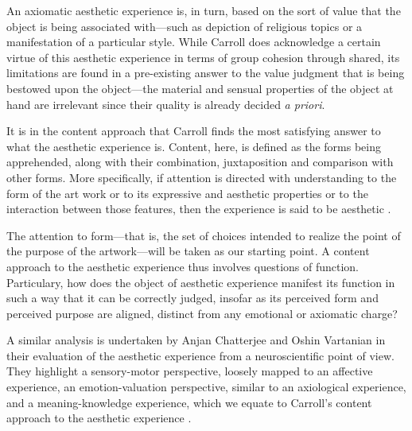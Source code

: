 An axiomatic aesthetic experience is, in turn, based on the sort of value that the object is being associated with—such as depiction of religious topics or a manifestation of a particular style. While Carroll does acknowledge a certain virtue of this aesthetic experience in terms of group cohesion through shared, its limitations are found in a pre-existing answer to the value judgment that is being bestowed upon the object—the material and sensual properties of the object at hand are irrelevant since their quality is already decided \emph{a priori}.

It is in the content approach that Carroll finds the most satisfying answer to what the aesthetic experience is. Content, here, is defined as the forms being apprehended, along with their combination, juxtaposition and comparison with other forms. More specifically, if attention is directed with understanding to the form of the art work or to its expressive and aesthetic properties or to the interaction between those features, then the experience is said to be aesthetic \citep{carroll_aesthetic_2002}.

The attention to form—that is, the set of choices intended to realize the point of the purpose of the artwork—will be taken as our starting point. A content approach to the aesthetic experience thus involves questions of function. Particulary, how does the object of aesthetic experience manifest its function in such a way that it can be correctly judged, insofar as its perceived form and perceived purpose are aligned, distinct from any emotional or axiomatic charge?

A similar analysis is undertaken by Anjan Chatterjee and Oshin Vartanian in their evaluation of the aesthetic experience from a neuroscientific point of view. They highlight a sensory-motor perspective, loosely mapped to an affective experience, an emotion-valuation perspective, similar to an axiological experience, and a meaning-knowledge experience, which we equate to Carroll's content approach to the aesthetic experience \citep{chatterjee_neuroscience_2016}.

